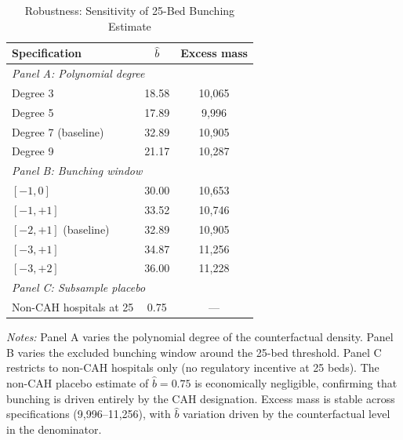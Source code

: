 \begin{table}[htbp]
\centering
\caption{Robustness: Sensitivity of 25-Bed Bunching Estimate}
\label{tab:robust}
\begin{tabular}{lcc}
\hline\hline
Specification & $\hat{b}$ & Excess mass \\
\hline
\multicolumn{3}{l}{\textit{Panel A: Polynomial degree}} \\
Degree 3 & 18.58 & 10,065 \\
Degree 5 & 17.89 & 9,996 \\
Degree 7 (baseline) & 32.89 & 10,905 \\
Degree 9 & 21.17 & 10,287 \\
\hline
\multicolumn{3}{l}{\textit{Panel B: Bunching window}} \\
$[-1, 0]$ & 30.00 & 10,653 \\
$[-1, +1]$ & 33.52 & 10,746 \\
$[-2, +1]$ (baseline) & 32.89 & 10,905 \\
$[-3, +1]$ & 34.87 & 11,256 \\
$[-3, +2]$ & 36.00 & 11,228 \\
\hline
\multicolumn{3}{l}{\textit{Panel C: Subsample placebo}} \\
Non-CAH hospitals at 25 & 0.75 & --- \\
\hline\hline
\end{tabular}
\begin{tablenotes}
\small
\item \textit{Notes:} Panel A varies the polynomial degree of the counterfactual density. Panel B varies the excluded bunching window around the 25-bed threshold. Panel C restricts to non-CAH hospitals only (no regulatory incentive at 25 beds). The non-CAH placebo estimate of $\hat{b} = 0.75$ is economically negligible, confirming that bunching is driven entirely by the CAH designation. Excess mass is stable across specifications (9,996--11,256), with $\hat{b}$ variation driven by the counterfactual level in the denominator.
\end{tablenotes}
\end{table}


